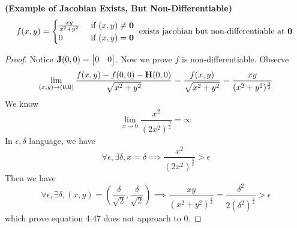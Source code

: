\documentclass{report}
\begin{document}
\begin{theorem}
\label{4.2.9}
\textbf{(Example of Jacobian Exists, But Non-Differentiable)} 
\begin{equation}
f(x,y)=\begin{cases}
  \frac{xy}{x^2+y^2}& \text{ if  }(x,y)\neq \textbf{0}\\
  0& \text{ if  }(x,y)=\textbf{0}
\end{cases}\text{ exists jacobian but non-differentiable at $\textbf{0}$  }
\end{equation}
\end{theorem}
\begin{proof}
Notice $\textbf{J}(0,0)=\begin{bmatrix}
  0&0
\end{bmatrix}$. Now we prove $f$ is non-differentiable. Observe
\begin{equation}
\lim_{(x,y)\to (0,0)}\frac{f(x,y)-f(0,0)-\textbf{H}(0,0)}{\sqrt{x^2+y^2} }=\frac{f(x,y)}{\sqrt{x^2+y^2} }=\frac{xy}{(x^2+y^2)^{\frac{3}{2}}}
\end{equation}
We know 
\begin{equation}
\lim_{x\to 0}\frac{x^2}{(2x^2)^{\frac{3}{2}}}=\infty
\end{equation}
In $\epsilon,\delta$ language, we have
\begin{equation}
\forall \epsilon, \exists \delta, x=\delta\implies  \frac{x^2}{(2x^2)^{\frac{3}{2}}}>\epsilon 
\end{equation}
Then we have 
\begin{equation}
  \forall \epsilon ,\exists \delta, (x,y)=(\frac{\delta}{\sqrt{2}},\frac{\delta}{\sqrt{2}}) \implies \frac{xy}{(x^2+y^2)^{\frac{3}{2}}}=\frac{\delta^2}{2(\delta^2)^{\frac{3}{2}}}>\epsilon 
\end{equation}
which prove  equation 4.47 does not approach to 0.
\end{proof}
\end{document}
